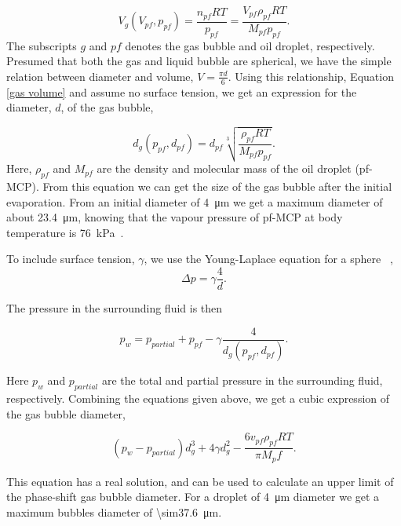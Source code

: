 \begin{equation}
\label{gas volume}
V_g(V_{pf}, p_{pf}) = \frac{n_{pf}RT}{p_{pf}}=\frac{V_{pf}\rho_{pf}RT}{M_{pf}p_{pf}}.
\end{equation}
The subscripts $g$ and $pf$ denotes the gas bubble and oil droplet, respectively. Presumed that both the gas and liquid bubble are spherical, we have the simple relation between diameter and volume, $V = \frac{\pi d}{6}$. Using this relationship, Equation \eqref{gas volume} and assume no surface tension, we get an expression for the diameter, $d$, of the gas bubble,  

\begin{equation}
\label{diameter}
d_g(p_{pf}, d_{pf}) = d_{pf}\sqrt[3]{\frac{\rho_{pf}RT}{M_{pf}p_{pf}}}.
\end{equation}
Here, $\rho_{pf}$ and $M_{pf}$ are the density and molecular mass of the oil droplet (pf-MCP). From this equation we can get the size of the gas bubble after the initial evaporation. From an initial diameter of \SI{4}{\micro\metre} we get a maximum diameter of about \SI{23.4}{\micro\metre}, knowing that the vapour pressure of pf-MCP at body temperature is \SI{76}{\kilo\pascal}~\cite{Healey2013}.

To include surface tension, $\gamma$, we use the Young-Laplace equation for a sphere ~\cite{Schramm2006},
\begin{equation}
\label{Young-Laplace}
\Delta p = \gamma\frac{4}{d}.
\end{equation}

The pressure in the surrounding fluid is then 

\begin{equation}
p_w = p_{partial} + p_{pf} - \gamma \frac{4}{d_g(p_{pf}\mathrm{, } d_{pf})}.
\end{equation}

Here $p_w$ and $p_{partial}$ are the total and partial pressure in the surrounding fluid, respectively. Combining the equations given above, we get a cubic expression of the gas bubble diameter,  

\begin{equation}
\label{cubic}
(p_w-p_{partial})d_g^3 + 4\gamma d_g^2 - \frac{6v_{pf}\rho_{pf}RT}{\pi M_pf}.
\end{equation}

This equation has a real solution, and can be used to calculate an upper limit of the phase-shift gas bubble diameter. For a droplet of \SI{4}{\micro\meter} diameter we get a maximum bubbles diameter of \SI{\sim37.6}{\micro\meter}. %

